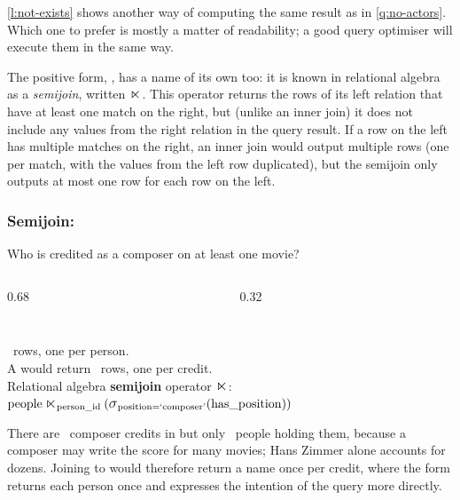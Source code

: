 \autoref{l:not-exists} shows another way of computing the same result as in \autoref{q:no-actors}.
Which one to prefer is mostly a matter of readability; a good query optimiser will execute them in the same way.

The positive form, , has a name of its own too: it is known in relational algebra as a \emph{semijoin}, written $\rabin{\ltimes}$.
This operator returns the rows of its left relation that have at least one match on the right, but (unlike an inner join) it does not include any values from the right relation in the query result.
If a row on the left has multiple matches on the right, an inner join would output multiple rows (one per match, with the values from the left row duplicated), but the semijoin only outputs at most one row for each row on the left.

\begin{frame}
    \label{s:semijoin}
    \frametitle{Semijoin: }
    Who is credited as a composer on at least one movie?
    \begin{columns}[T,onlytextwidth]
        \begin{column}{0.68\textwidth}
            \inputminted[fontsize=\footnotesize]{sql}{code/sql-exists.sql}
        \end{column}
        \begin{column}{0.32\textwidth}
            {\footnotesize}
        \end{column}
    \end{columns}\pause
    \vspace{0.8em}
    \qcountcomposers\ rows, one per person.\\
    A  would return \qcountcomposercredits\ rows, one per credit.\\[0.8em]
    Relational algebra \textbf{semijoin} operator $\rabin{\ltimes}$:\\[0.3em]
    \hspace*{1em}$\ra{people} \rabin{\ltimes}_{\ra{person\_id}} (\raop{\sigma}_{\ra{position} = \text{`composer'}}(\ra{has\_position}))$
\end{frame}
\label{l:semijoin}

There are \qcountcomposercredits\ composer credits in  but only \qcountcomposers\ people holding them, because a composer may write the score for many movies; Hans Zimmer alone accounts for dozens.
Joining  to  would therefore return a name once per credit, where the  form returns each person once and expresses the intention of the query more directly.

